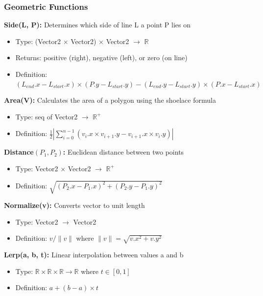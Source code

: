\documentclass[12pt, titlepage]{article}
\begin{document}
\subsubsection{Geometric Functions}

\textbf{Side(L, P):} Determines which side of line L a point P lies on
\begin{itemize}
\item Type: (Vector2 $\times$ Vector2) $\times$ Vector2 $\rightarrow$ $\mathbb{R}$
\item Returns: positive (right), negative (left), or zero (on line)
\item Definition: $(L_{end}.x - L_{start}.x) \times (P.y - L_{start}.y) - (L_{end}.y - L_{start}.y) \times (P.x - L_{start}.x)$
\end{itemize}

\vspace{5mm}

\textbf{Area(V):} Calculates the area of a polygon using the shoelace formula
\begin{itemize}
\item Type: seq of Vector2 $\rightarrow$ $\mathbb{R}^+$
\item Definition: $\frac{1}{2}|\sum_{i=0}^{n-1}(v_i.x \times v_{i+1}.y - v_{i+1}.x \times v_i.y)|$
\end{itemize}

\vspace{5mm}

\textbf{Distance$(P_1, P_2)$:} Euclidean distance between two points
\begin{itemize}
\item Type: Vector2 $\times$ Vector2 $\rightarrow$ $\mathbb{R}^+$
\item Definition: $\sqrt{(P_2.x - P_1.x)^2 + (P_2.y - P_1.y)^2}$
\end{itemize}

\vspace{5mm}

\textbf{Normalize(v):} Converts vector to unit length
\begin{itemize}
\item Type: Vector2 $\rightarrow$ Vector2
\item Definition: $v/\|v\|$ where $\|v\| = \sqrt{v.x^2 + v.y^2}$
\end{itemize}

\vspace{5mm}

\textbf{Lerp(a, b, t):} Linear interpolation between values a and b
\begin{itemize}
\item Type: $\mathbb{R} \times \mathbb{R} \times \mathbb{R} \rightarrow \mathbb{R}$ where $t \in [0, 1]$
\item Definition: $a + (b - a) \times t$
\end{itemize}
\end{document}
